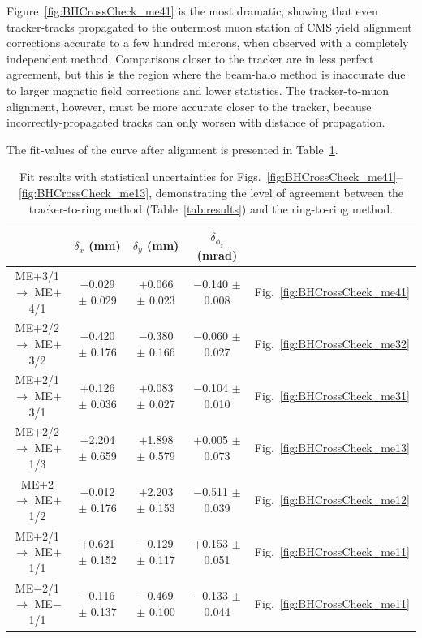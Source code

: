\documentclass[12pt]{article}
\begin{document}
Figure~\ref{fig:BHCrossCheck_me41} is the most dramatic, showing that
even tracker-tracks propagated to the outermost muon station of CMS
yield alignment corrections accurate to a few hundred microns, when
observed with a completely independent method.  Comparisons closer to
the tracker are in less perfect agreement, but this is the region
where the beam-halo method is inaccurate due to larger magnetic
field corrections and lower statistics.  The tracker-to-muon
alignment, however, must be more accurate closer to the tracker,
because incorrectly-propagated tracks can only worsen with distance of
propagation.

The fit-values of the curve after alignment is presented in
Table~\ref{tab:second_systematics_table}.

\begin{table}
\caption{Fit results with statistical uncertainties for
  Figs.~\ref{fig:BHCrossCheck_me41}--\ref{fig:BHCrossCheck_me13},
  demonstrating the level of agreement between the tracker-to-ring
  method (Table~\ref{tab:results}) and the ring-to-ring
  method. \label{tab:second_systematics_table}}
\begin{center}
\renewcommand{\arraystretch}{1.2}
\begin{tabular}{c c c c c}
& $\delta_x$ (mm) & $\delta_y$ (mm) & $\delta_{\phi_z}$ (mrad) \\\hline
ME$+$3/1 $\to$ ME$+$4/1 & $-$0.029 $\pm$ 0.029 & $+$0.066 $\pm$ 0.023 & $-$0.140 $\pm$ 0.008 & Fig.~\ref{fig:BHCrossCheck_me41} \\
ME$+$2/2 $\to$ ME$+$3/2 & $-$0.420 $\pm$ 0.176 & $-$0.380 $\pm$ 0.166 & $-$0.060 $\pm$ 0.027 & Fig.~\ref{fig:BHCrossCheck_me32} \\
ME$+$2/1 $\to$ ME$+$3/1 & $+$0.126 $\pm$ 0.036 & $+$0.083 $\pm$ 0.027 & $-$0.104 $\pm$ 0.010 & Fig.~\ref{fig:BHCrossCheck_me31} \\
ME$+$2/2 $\to$ ME$+$1/3 & $-$2.204 $\pm$ 0.659 & $+$1.898 $\pm$ 0.579 & $+$0.005 $\pm$ 0.073 & Fig.~\ref{fig:BHCrossCheck_me13} \\
ME$+$2 $\to$ ME$+$1/2 & $-$0.012 $\pm$ 0.176 & $+$2.203 $\pm$ 0.153 & $-$0.511 $\pm$ 0.039 & Fig.~\ref{fig:BHCrossCheck_me12} \\
ME$+$2/1 $\to$ ME$+$1/1 & $+$0.621 $\pm$ 0.152 & $-$0.129 $\pm$ 0.117 & $+$0.153 $\pm$ 0.051 & Fig.~\ref{fig:BHCrossCheck_me11} \\\hline
ME$-$2/1 $\to$ ME$-$1/1 & $-$0.116 $\pm$ 0.137 & $-$0.469 $\pm$ 0.100 & $-$0.133 $\pm$ 0.044 & Fig.~\ref{fig:BHCrossCheck_me11} \\

\end{tabular}
\end{center}
\end{table}
\end{document}
